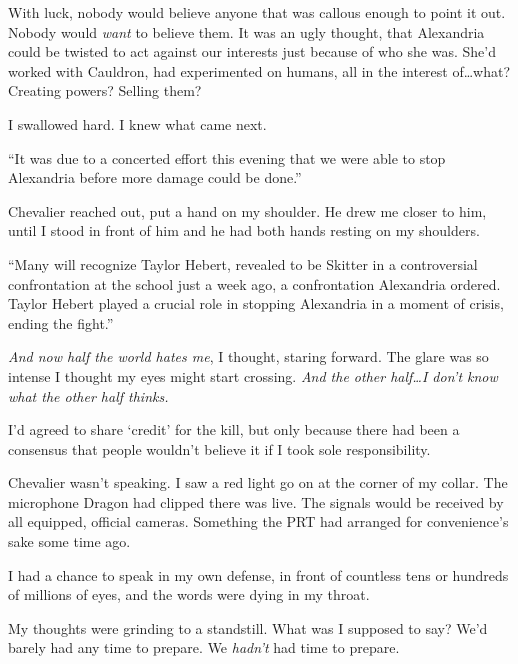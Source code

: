 With luck, nobody would believe anyone that was callous enough to point it out.  Nobody would \emph{want} to believe them.  It was an ugly thought, that Alexandria could be twisted to act against our interests just because of who she was.  She'd worked with Cauldron, had experimented on humans, all in the interest of\ldots what?  Creating powers?  Selling them?



I swallowed hard.  I knew what came next.



``It was due to a concerted effort this evening that we were able to stop Alexandria before more damage could be done.''



Chevalier reached out, put a hand on my shoulder.  He drew me closer to him, until I stood in front of him and he had both hands resting on my shoulders.



``Many will recognize Taylor Hebert, revealed to be Skitter in a controversial confrontation at the school just a week ago, a confrontation Alexandria ordered.  Taylor Hebert played a crucial role in stopping Alexandria in a moment of crisis, ending the fight.''



\emph{And now half the world hates me}, I thought, staring forward.  The glare was so intense I thought my eyes might start crossing.  \emph{And the other half\ldots I don't know what the other half thinks.}



I'd agreed to share `credit' for the kill, but only because there had been a consensus that people wouldn't believe it if I took sole responsibility.



Chevalier wasn't speaking.  I saw a red light go on at the corner of my collar.  The microphone Dragon had clipped there was live.  The signals would be received by all equipped, official cameras.  Something the PRT had arranged for convenience's sake some time ago.



I had a chance to speak in my own defense, in front of countless tens or hundreds of millions of eyes, and the words were dying in my throat.



My thoughts were grinding to a standstill.  What was I supposed to say?  We'd barely had any time to prepare.  We \emph{hadn't} had time to prepare.



